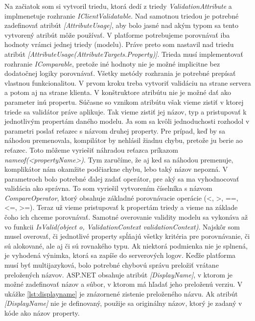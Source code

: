 \documentclass[11pt, oneside]{report}
\begin{document}
Na začiatok som si vytvoril triedu, ktorá dedí z triedy \textit{ValidationAttribute} a implmenetuje rozhranie \textit{IClientValidatable}. Nad samotnou triedou je potrebné zadefinovať atribút \textit{[AttributeUsage]}, aby bolo jasné nad akým typom sa tento vytvorený atribút môže používať. V platforme potrebujeme porovnávať iba hodnoty vrámci jednej triedy (modelu). Práve preto som nastavil nad triedu atribút \textit{[AttributeUsage(AttributeTargets.Property)]}. Trieda musí implementovať rozhranie \textit{IComparable}, pretože iné hodnoty nie je možné implicitne bez dodatočnej logiky porovnávať. Všetky metódy rozhrania  je potrebné prepísať vlastnou funkcionalitou.  V prvom kroku  treba vytvoriť validáciu na strane servera a potom aj na strane klienta. V konštruktore atribútu nie je možné dať ako parameter inú propertu. Súčasne so vznikom atribútu však vieme zistiť v ktorej triede sa validátor práve aplikuje. Tak vieme zistiť jej názov, typ a pristupovať  k jednotlivým propertám daného modelu. Ja som sa kvôli jednoduchosti rozhodol v parametri poslať reťazec s názvom druhej property.  Pre prípad, keď by sa náhodou premenovala,  kompilátor by nehlásil žiadnu chybu, pretože ju berie ao reťazec. Toto môžeme vyriešiť náhradou reťazca príkazom  \textit{nameof(<propertyName>)}. Tym zaručíme, že aj ked sa  náhodou premenuje, komplikátor nám okamžite podčiarkne chybu, lebo taký názov nepozná. V parametroch bolo potrebné ďalej zadať operátor, pre aký sa ma vyhodnocovať validácia ako správna. To som vyriešil vytvorením číselníka s názvom \textit{CompareOperator}, ktorý obsahuje základné porovnávacie operácie (<, >, ==, <=, >=). Teraz už vieme pristupovať k propertám triedy a vieme na základe čoho ich chceme porovnávať. Samotné overovanie  validity modelu sa vykonáva až vo funkcii \textit{IsValid(object o, ValidationContext validationContext)}. Najskôr som musel overovať, či jednotlivé property spĺňajú všetky kritéria pre porovnávanie, či sú alokované, ale aj či sú rovnakého typu. Ak  niektorá podmienka nie je splnená, je vyhodená výnimka, ktorá sa zapíše do  serverových logov. Keďže platforma  musí byť multijazyková,  bolo potrebné chybovú správu preložiť vrátane preložených názvov. ASP.NET obsahuje atribút \textit{[DisplayName]}, v ktorom je možné zadefinovať názov a súbor, v ktorom má hľadať jeho preloženú verziu. V ukážke \ref{lst:displayname} je znázornené zistenie preloženého názvu. Ak  atribút \textit{[DisplayName]} nie je definovaný, použije sa originálny názov, ktorý je zadaný v kóde ako názov property. \\
 
\end{document}

